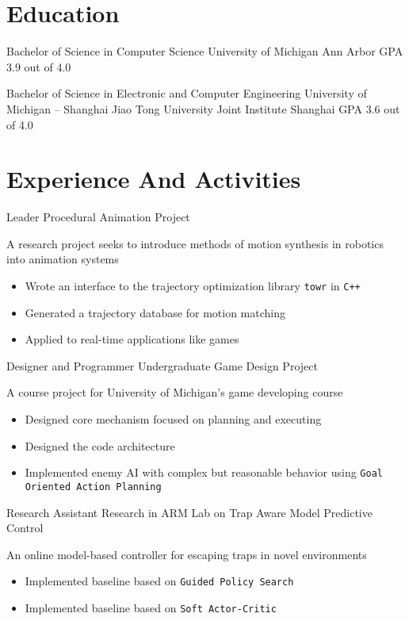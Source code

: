 \documentclass[10pt, a4paper, sans]{moderncv}
\title{}
\begin{document}
\makecvtitle

\section{Education}
{Bachelor of Science in Computer Science}
{University of Michigan}
{Ann Arbor}
{GPA 3.9 out of 4.0}
{}

{Bachelor of Science in Electronic and Computer Engineering}
{University of Michigan -- Shanghai Jiao Tong University Joint Institute}
{Shanghai}
{GPA 3.6 out of 4.0}
{}

\section{Experience And Activities}
{Leader}
{Procedural Animation Project}
{}{}
{A research project seeks to introduce methods of motion synthesis in robotics into animation systems
	\begin{itemize}
		\item Wrote an interface to the trajectory optimization library \texttt{towr} in \texttt{C++}
		\item Generated a trajectory database for motion matching
		\item Applied to real-time applications like games
	\end{itemize}
}

{Designer and Programmer}
{Undergraduate Game Design Project}
{}{}
{A course project for University of Michigan's game developing course
	\begin{itemize}
		\item Designed core mechanism focused on planning and executing
		\item Designed the code architecture
		\item Implemented enemy AI with complex but reasonable behavior using \texttt{Goal Oriented Action Planning}
	\end{itemize}
}

{Research Assistant}
{Research in ARM Lab on Trap Aware Model Predictive Control}
{}{}
{An online model-based controller for escaping traps in novel environments
	\begin{itemize}
		\item Implemented baseline based on \texttt{Guided Policy Search}
		\item Implemented baseline based on \texttt{Soft Actor-Critic}
	\end{itemize}
}
\end{document}
